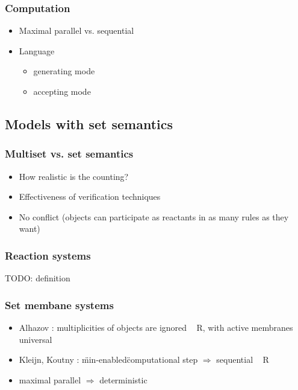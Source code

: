     \begin{frame}[t]\frametitle{Computation}
      \begin{itemize}
        \item Maximal parallel vs. sequential
        \pause
        \item Language
        \begin{itemize}
          \item generating mode
          \item accepting mode
        \end{itemize}
      \end{itemize}

    \end{frame}
    \note{}


  \subsection{Models with set semantics} %
  \label{sub:models_with_set_semantics}
    
    \begin{frame}[t]\frametitle{Multiset vs. set semantics}
      \begin{itemize}
        \item How realistic is the counting?
        \item Effectiveness of verification techniques
        \item No conflict (objects can participate as reactants in as many rules as they want)
      \end{itemize}
      
    \end{frame}
    \note{}

    \begin{frame}[t]\frametitle{Reaction systems}
      TODO: definition
    \end{frame}
    \note{}

    \begin{frame}[t]\frametitle{Set membane systems}
      \begin{itemize}
        \item Alhazov \cite{Alhazov05WithoutMultiplicities}: multiplicities of objects are ignored ~ R, with active membranes universal
        \item Kleijn, Koutny \cite{Kleijn11SetMembrane}: \"min-enabled\" computational step $\Rightarrow$ sequential ~ R
        \item maximal parallel $\Rightarrow$ deterministic
      \end{itemize}
    \end{frame}
    \note{}

